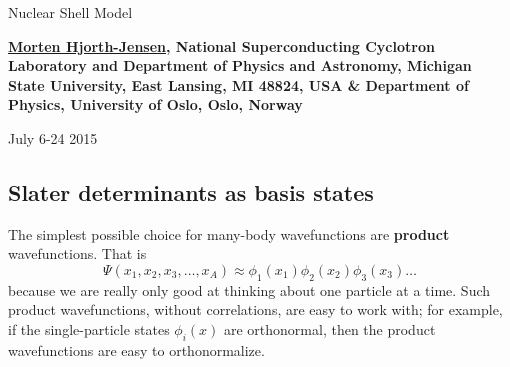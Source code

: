 \documentclass[%
twoside,                 %
final,                   %
10pt]{article}
\begin{document}






\thispagestyle{empty}

\begin{center}
{\LARGE\bf
\begin{spacing}{1.25}
Nuclear Shell Model
\end{spacing}
}
\end{center}


\begin{center}
{\bf \href{{http://computationalphysics.no}}{Morten Hjorth-Jensen}, National Superconducting Cyclotron Laboratory and Department of Physics and Astronomy, Michigan State University, East Lansing, MI 48824, USA {\&} Department of Physics, University of Oslo, Oslo, Norway${}^{}$} \\ [0mm]
\end{center}

    \begin{center}
\end{center}
    

\begin{center} %
July 6-24 2015
\end{center}

\vspace{1cm}


\tableofcontents


\vspace{1cm} %




\subsection{Slater determinants as basis states}

The simplest possible choice for many-body wavefunctions are \textbf{product} wavefunctions.
That is
\[ 
\Psi(x_1, x_2, x_3, \ldots, x_A) \approx \phi_1(x_1) \phi_2(x_2) \phi_3(x_3) \ldots
\]
because we are really only good  at thinking about one particle at a time. Such 
product wavefunctions, without correlations, are easy to 
work with; for example, if the single-particle states $\phi_i(x)$ are orthonormal, then 
the product wavefunctions are easy to orthonormalize.   
\end{document}
